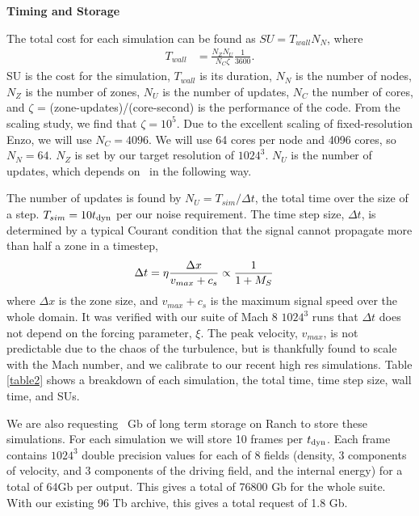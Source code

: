 \vspace{1in}
\begin{Large}
	\noindent\textbf{Timing and Storage}
\end{Large}


The total cost for each simulation can be found as 
$SU = T_{wall} N_N$, where
\begin{align}
T_{wall} &= \frac{N_Z N_U}{N_C \zeta} \frac{1}{3600}.
\end{align}
SU is the cost for the simulation, $T_{wall}$ is its duration, $N_N$ is the number of nodes, $N_Z$ is the number of zones, $N_U$ is the number of updates, $N_C$ the
number of cores, and $\zeta$ = (zone-updates)/(core-second) is the performance of
the code.  
From the scaling
study, we find that $\zeta=10^5$.  
Due to the excellent scaling of
fixed-resolution Enzo, we will use $N_C=4096$.
We will use 64 cores per node and 4096
cores, so $N_N=64$.
$N_Z$ is set by our target resolution of $1024^3$.  
$N_U$ is the number of updates,
which depends on \Mach\ in the following way.

The number of updates is found by $N_U=T_{sim}/\Delta t$, the total time over
the size of a step.  $T_{sim}=10t_{\rm{dyn}}$ per
our noise requirement.  The time step size, $\Delta t$, is determined by a
typical Courant condition that the signal cannot propagate more than half a zone
in a timestep,
\begin{align}
\Delta t &= \eta \frac{\Delta x}{v_{max}+ c_s} \propto \frac{1}{1+M_{S}}
\end{align}
where $\Delta x$ is the zone size, and $v_{max}+c_s$ is the maximum signal speed over
the whole domain.
It was verified with our suite of Mach 8 $1024^3$ runs that $\Delta t$ does not
depend on the forcing parameter, $\xi$.  
The peak velocity, $v_{max}$, is not predictable due to the chaos of the
turbulence, but is thankfully found to scale with the Mach number, and we
calibrate to our recent high res simulations.  Table \ref{table2} shows a
breakdown of each simulation, the total time, time step size, wall time, and
SUs.

We are also requesting \requestdisk\ Gb of long term storage on Ranch to store
these simulations.  For each simulation we will store 10 frames per $t_{\rm{dyn}}$.
Each frame contains $1024^3$ double precision values for each of 8 fields
(density, 3 components of velocity, and 3 components of the driving field, and
the internal energy) for a total of 64Gb per output.  This gives a total of
76800 Gb for the whole suite.  With our existing 96 Tb archive, this gives a
total request of 1.8 Gb.


